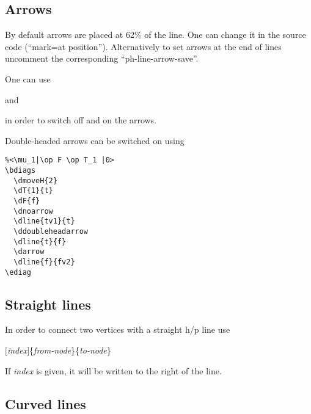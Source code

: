 \documentclass[a4paper]{article}
\newcommand{\myind}{\hspace{10pt}}
\begin{document}
\subsection{Arrows}

By default arrows are placed at 62\% of the line. One can change it in the source code 
(``mark=at position'').
Alternatively to set arrows at the end of lines uncomment the corresponding ``ph-line-arrow-save''.

One can use 

\myind{\bf \textbackslash dnoarrow}

and

\myind{\bf \textbackslash darrow}

in order to switch off and on the arrows.

Double-headed arrows can be switched on using 

\myind{\bf \textbackslash ddoubleheadarrow}

 \begin{minipage}[b]{0.55\linewidth}\centering
  \begin{lstlisting}
%<\mu_1|\op F \op T_1 |0>
\bdiags
  \dmoveH{2}
  \dT{1}{t}
  \dF{f}
  \dnoarrow
  \dline{tv1}{t}
  \ddoubleheadarrow
  \dline{t}{f}
  \darrow
  \dline{f}{fv2}
\ediag 
  \end{lstlisting}
 \end{minipage}
 \begin{minipage}[b]{0.45\linewidth}\centering
    \bdiags
    \dnoarrow
    \ddoubleheadarrow
    \darrow
    \ediag
 \end{minipage}


\subsection{Straight lines}

In order to connect two vertices with a straight h/p line use

\myind{\bf \textbackslash dline}$[${\it index}$]$\{{\it from-node}\}\{{\it to-node}\}

If {\it index} is given, it will be written to the right of the line.

\subsection{Curved lines}
\end{document}
